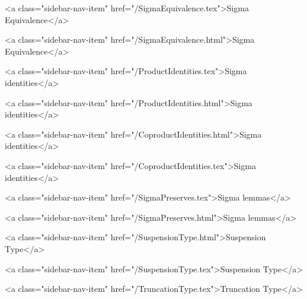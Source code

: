       
    
      
        
          <a class="sidebar-nav-item" href="/SigmaEquivalence.tex">Sigma Equivalence</a>
        
      
    
      
        
          <a class="sidebar-nav-item" href="/SigmaEquivalence.html">Sigma Equivalence</a>
        
      
    
      
        
          <a class="sidebar-nav-item" href="/ProductIdentities.tex">Sigma identities</a>
        
      
    
      
        
          <a class="sidebar-nav-item" href="/ProductIdentities.html">Sigma identities</a>
        
      
    
      
        
          <a class="sidebar-nav-item" href="/CoproductIdentities.html">Sigma identities</a>
        
      
    
      
        
          <a class="sidebar-nav-item" href="/CoproductIdentities.tex">Sigma identities</a>
        
      
    
      
        
          <a class="sidebar-nav-item" href="/SigmaPreserves.tex">Sigma lemmas</a>
        
      
    
      
        
          <a class="sidebar-nav-item" href="/SigmaPreserves.html">Sigma lemmas</a>
        
      
    
      
        
          <a class="sidebar-nav-item" href="/SuspensionType.html">Suspension Type</a>
        
      
    
      
        
          <a class="sidebar-nav-item" href="/SuspensionType.tex">Suspension Type</a>
        
      
    
      
        
          <a class="sidebar-nav-item" href="/TruncationType.tex">Truncation Type</a>
        
